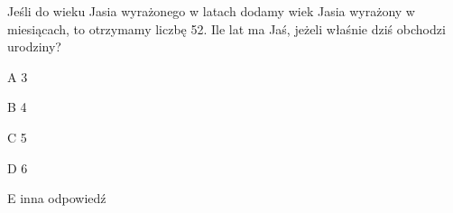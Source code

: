 \begin{tresc}
Jeśli do wieku Jasia wyrażonego w latach dodamy wiek Jasia wyrażony w miesiącach, to otrzymamy liczbę 52. Ile lat ma Jaś, jeżeli właśnie dziś obchodzi urodziny?
\end{tresc}
\begin{wariant}{A} 3 \end{wariant}
\begin{wariant}{B} 4 \end{wariant}
\begin{wariant}{C} 5 \end{wariant}
\begin{wariant}{D} 6 \end{wariant}
\begin{wariant}{E} inna odpowiedź \end{wariant}
